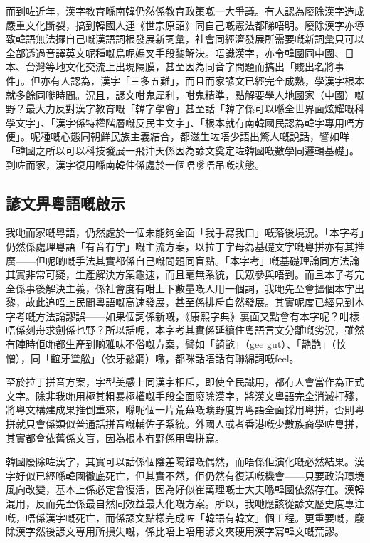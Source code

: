 而到咗近年，漢字教育喺南韓仍然係教育政策嘅一大爭議。有人認為廢除漢字造成嚴重文化斷裂，搞到韓國人連《世宗原詔》同自己嘅憲法都睇唔明。廢除漢字亦導致韓語無法攞自己嘅漢語詞根發展新詞彙，社會同經濟發展所需要嘅新詞彙只可以全部透過音譯英文呢種嘅烏呢媽叉手段黎解決。唔識漢字，亦令韓國同中國、日本、台灣等地文化交流上出現隔膜，甚至因為同音字問題而搞出「賤出名將事件」。但亦有人認為，漢字「三多五難」，而且而家諺文已經完全成熟，學漢字根本就多餘同嘥時間。況且，諺文咁鬼犀利，咁鬼精準，點解要學人地國家（中國）嘅野？最大力反對漢字教育嘅「韓字學會」甚至話「韓字係可以喺全世界面炫耀嘅科學文字」、「漢字係特權階層嘅反民主文字」、「根本就冇南韓國民認為韓字專用唔方便」。呢種嘅心態同朝鮮民族主義結合，都滋生咗唔少語出驚人嘅說話，譬如咩「韓國之所以可以科技發展一飛沖天係因為諺文奠定咗韓國嘅數學同邏輯基礎」。到咗而家，漢字復用喺南韓仲係處於一個唔嗲唔吊嘅狀態。

\subsection*{諺文畀粵語嘅啟示}

我哋而家嘅粵語，仍然處於一個未能夠全面「我手寫我口」嘅落後境況。「本字考」仍然係處理粵語「有音冇字」嘅主流方案，以拉丁字母為基礎文字嘅粵拼亦有其推廣——但呢啲嘅手法其實都係自己嘅問題同盲點。「本字考」嘅基礎理論同方法論其實非常可疑，生產解決方案龜速，而且毫無系統，民眾參與唔到。而且本子考完全係事後解決主義，係社會度有咁上下數量嘅人用一個詞，我哋先至會搵個本字出黎，故此追唔上民間粵語嘅高速發展，甚至係排斥自然發展。其實呢度已經見到本字考嘅方法論謬誤——如果個詞係新嘅，《康熙字典》裏面又點會有本字呢？咁樣唔係刻舟求劍係乜野？所以話呢，本字考其實係延續住粵語言文分離嘅劣況，雖然有陣時佢哋都生產到啲雅味不俗嘅方案，譬如「齮齕」（gee
gut）、「䒐䒏」（忟憎），同「𪘲牙聳䚗」（依牙鬆鋼）噉，都咪話唔話有聯綿詞嘅feel。


至於拉丁拼音方案，字型美感上同漢字相斥，即使全民識用，都冇人會當作為正式文字。除非我哋用極其粗暴極權嘅手段全面廢除漢字，將漢文粵語完全消滅打殘，將粵文構建成果推倒重來，喺呢個一片荒蕪嘅曠野度畀粵語全面採用粵拼，否則粵拼就只會係類似普通話拼音嘅輔佐子系統。外國人或者香港嘅少數族裔學咗粵拼，其實都會依舊係文盲，因為根本冇野係用粵拼寫。

韓國廢除咗漢字，其實可以話係個陰差陽錯嘅偶然，而唔係佢演化嘅必然結果。漢字好似已經喺韓國徹底死亡，但其實不然，佢仍然有復活嘅機會——只要政治環境風向改變，基本上係必定會復活，因為好似崔萬理嘅士大夫喺韓國依然存在。漢韓混用，反而先至係最自然同效益最大化嘅方案。所以，我哋應該從諺文歷史度專注嘅，唔係漢字嘅死亡，而係諺文點樣完成咗「韓語有韓文」個工程。更重要嘅，廢除漢字然後諺文專用所損失嘅，係比唔上唔用諺文夾硬用漢字寫韓文嘅荒謬。

